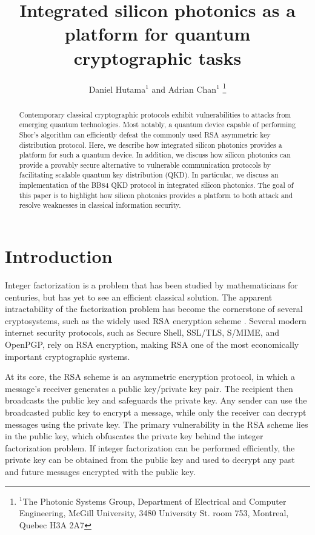 \documentclass[letterpaper, 10 pt, conference]{ieeeconf}  %
\title{\LARGE \bf
Integrated silicon photonics as a platform for quantum cryptographic tasks
}
\author{Daniel Hutama$^{1}$ and Adrian Chan$^{1}$%
\thanks{$^{1}$The Photonic Systems Group, Department of Electrical and Computer Engineering, McGill University, 3480 University St. room 753, Montreal, Quebec H3A 2A7}
}
\begin{document}
\maketitle
\thispagestyle{empty}
\pagestyle{empty}


\begin{abstract}


Contemporary classical cryptographic protocols exhibit vulnerabilities to attacks from emerging quantum technologies. Most notably, a quantum device capable of performing Shor's algorithm can efficiently defeat the commonly used RSA asymmetric key distribution protocol. Here, we describe how integrated silicon photonics provides a platform for such a quantum device. In addition, we discuss how silicon photonics can provide a provably secure alternative to vulnerable communication protocols by facilitating scalable quantum key distribution (QKD). In particular, we discuss an implementation of the BB84 QKD protocol in integrated silicon photonics. The goal of this paper is to highlight how silicon photonics provides a platform to both attack and resolve weaknesses in classical information security. 

\end{abstract}


\section{Introduction}


Integer factorization is a problem that has been studied by mathematicians for centuries, but has yet to see an efficient classical solution. The apparent intractability of the factorization problem has become the cornerstone of several cryptosystems, such as the widely used RSA encryption scheme \cite{RSA78}. Several modern internet security protocols, such as Secure Shell, SSL/TLS, S/MIME, and OpenPGP, rely on RSA encryption, making RSA one of the most economically important cryptographic systems. 

At its core, the RSA scheme is an asymmetric encryption protocol, in which a message's receiver generates a public key/private key pair. The recipient then
broadcasts the public key and safeguards the private key. Any sender can use the broadcasted public key to encrypt a message, while only the receiver can decrypt messages using the private key. The primary vulnerability in the RSA scheme lies in the public key, which obfuscates the private key behind the integer factorization problem. If integer factorization can be performed efficiently, the private key can be obtained from the public key and used to decrypt any past and future messages encrypted with the public key.
\end{document}
